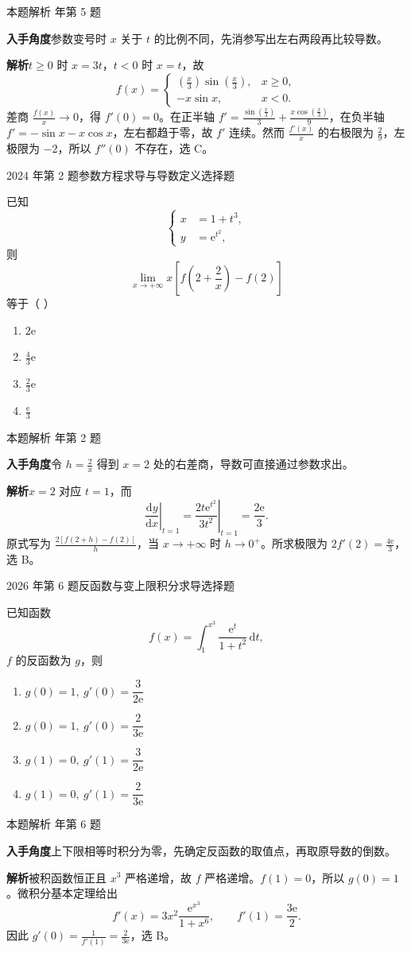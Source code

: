 \documentclass[UTF8,zihao=-4,fontset=fandol]{ctexart}
\renewcommand{\lim}{\operatorname*{lim}\limits}
\newenvironment{abcd}{\begin{enumerate}[label=\textup{(\Alph*)},leftmargin=2.3em,itemsep=1pt,topsep=4pt,parsep=1pt]}{\end{enumerate}}
\newcommand{\choices}[4]{%
  \begin{abcd}
    \item #1
    \item #2
    \item #3
    \item #4
  \end{abcd}}
\newcommand{\QuestionPage}[6]{%
  \par\noindent\begin{minipage}{\linewidth}
  \raggedright
  {\small\textcolor{black!60}{#3\quad #5}\hfill\textcolor{accent}{#2}}\par\smallskip}
\newcommand{\QuestionEnd}{\end{minipage}\par\medskip}
\newcommand{\QuestionPage}[6]{%
  \clearpage
  {\small\textcolor{accent}{#1\hfill #2}}\par\medskip
  {\small\textcolor{black!60}{#3\quad #5\hfill #6}}\par\vspace{9bp}}
\newcommand{\QuestionEnd}{}
\newenvironment{QuestionSolution}[1]{%
  \clearpage
  {\small\textcolor{black!60}{本题解析\quad #1}}\par\medskip
}{\par\clearpage}
\begin{document}
\begin{QuestionSolution}{2023 年第 5 题}
\textbf{入手角度}\quad 参数变号时 \(x\) 关于 \(t\) 的比例不同，先消参写出左右两段再比较导数。

\textbf{解析}\quad \(t\ge0\) 时 \(x=3t\)，\(t<0\) 时 \(x=t\)，故
\[
f(x)=
\begin{cases}
(\frac{x}{3})\sin(\frac{x}{3}),&x\ge0,\\
-x\sin x,&x<0.
\end{cases}
\]
差商 \(\frac{f(x)}{x}\to0\)，得 \(f'(0)=0\)。在正半轴 \(f'=\frac{\sin(\frac{x}{3})}{3}+\frac{x\cos(\frac{x}{3})}{9}\)，在负半轴 \(f'=-\sin x-x\cos x\)，左右都趋于零，故 \(f'\) 连续。然而 \(\frac{f'(x)}{x}\) 的右极限为 \(\frac{2}{9}\)，左极限为 \(-2\)，所以 \(f''(0)\) 不存在，选 C。
\end{QuestionSolution}

\QuestionPage{2.2 求导的基本法则}{选择题}{2024 年第 2 题}{1}{参数方程求导与导数定义}{060 / 234}
已知
\[\left\{
\begin{aligned}
x &= 1+t^3,\\
y &= \mathrm{e}^{t^2},
\end{aligned}
\right.
\]
则
\[\lim_{x\to+\infty}x\!\left[f\!\left(2+\frac{2}{x}\right)-f(2)\right]
\]
等于（ ）
\choices{\(2\mathrm{e}\)}{\(\frac{4}{3}\mathrm{e}\)}{\(\frac{2}{3}\mathrm{e}\)}{\(\frac{\mathrm{e}}{3}\)}
\QuestionEnd

\begin{QuestionSolution}{2024 年第 2 题}
\textbf{入手角度}\quad 令 \(h=\frac{2}{x}\) 得到 \(x=2\) 处的右差商，导数可直接通过参数求出。

\textbf{解析}\quad \(x=2\) 对应 \(t=1\)，而
\[
\left.\frac{\mathrm{d}y}{\mathrm{d}x}\right|_{t=1}
=\left.\frac{2t \mathrm{e}^{t^2}}{3t^2}\right|_{t=1}=\frac{2\mathrm{e}}{3}.
\]
原式写为 \(\frac{2[f(2+h)-f(2)]}{h}\)，当 \(x\to+\infty\) 时 \(h\to0^+\)。所求极限为 \(2f'(2)=\boxed{\frac{4\mathrm{e}}{3}}\)，选 B。
\end{QuestionSolution}

\QuestionPage{2.2 求导的基本法则}{选择题}{2026 年第 6 题}{1}{反函数与变上限积分求导}{061 / 234}
已知函数
\[f(x)=\int_1^{x^3}\frac{\mathrm{e}^t}{1+t^2}\,\mathrm{d}t,
\]
\(f\) 的反函数为 \(g\)，则
\choices{\(g(0)=1,\ g'(0)=\dfrac{3}{2\mathrm{e}}\)}{\(g(0)=1,\ g'(0)=\dfrac{2}{3\mathrm{e}}\)}{\(g(1)=0,\ g'(1)=\dfrac{3}{2\mathrm{e}}\)}{\(g(1)=0,\ g'(1)=\dfrac{2}{3\mathrm{e}}\)}
\QuestionEnd

\begin{QuestionSolution}{2026 年第 6 题}
\textbf{入手角度}\quad 上下限相等时积分为零，先确定反函数的取值点，再取原导数的倒数。

\textbf{解析}\quad 被积函数恒正且 \(x^3\) 严格递增，故 \(f\) 严格递增。\(f(1)=0\)，所以 \(g(0)=1\)。微积分基本定理给出
\[
f'(x)=3x^2\frac{\mathrm{e}^{x^3}}{1+x^6},\qquad f'(1)=\frac{3\mathrm{e}}{2}.
\]
因此 \(g'(0)=\frac{1}{f'(1)}=\boxed{\frac{2}{3\mathrm{e}}}\)，选 B。
\end{QuestionSolution}
\end{document}
